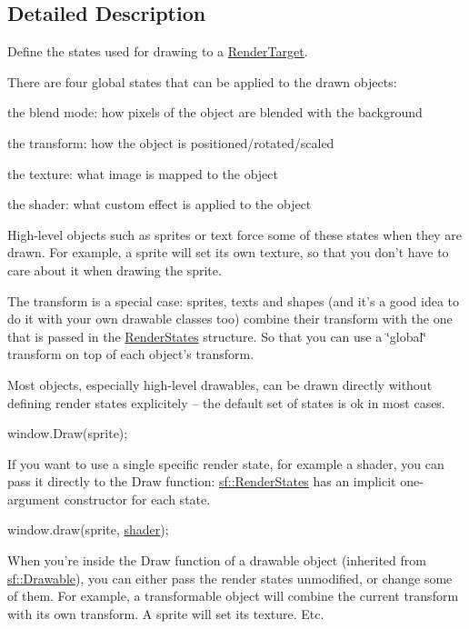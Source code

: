 \subsection{Detailed Description}
Define the states used for drawing to a \hyperlink{classsf_1_1_render_target}{Render\-Target}. 

There are four global states that can be applied to the drawn objects\-: \begin{DoxyItemize}
\item the blend mode\-: how pixels of the object are blended with the background \item the transform\-: how the object is positioned/rotated/scaled \item the texture\-: what image is mapped to the object \item the shader\-: what custom effect is applied to the object\end{DoxyItemize}
High-\/level objects such as sprites or text force some of these states when they are drawn. For example, a sprite will set its own texture, so that you don't have to care about it when drawing the sprite.

The transform is a special case\-: sprites, texts and shapes (and it's a good idea to do it with your own drawable classes too) combine their transform with the one that is passed in the \hyperlink{classsf_1_1_render_states}{Render\-States} structure. So that you can use a \char`\"{}global\char`\"{} transform on top of each object's transform.

Most objects, especially high-\/level drawables, can be drawn directly without defining render states explicitely -- the default set of states is ok in most cases. 
\begin{DoxyCode}
window.Draw(sprite);
\end{DoxyCode}


If you want to use a single specific render state, for example a shader, you can pass it directly to the Draw function\-: \hyperlink{classsf_1_1_render_states}{sf\-::\-Render\-States} has an implicit one-\/argument constructor for each state. 
\begin{DoxyCode}
window.draw(sprite, \hyperlink{gl3_8h_a57b2a96adb1d51204909a82d861e395e}{shader});
\end{DoxyCode}


When you're inside the Draw function of a drawable object (inherited from \hyperlink{classsf_1_1_drawable}{sf\-::\-Drawable}), you can either pass the render states unmodified, or change some of them. For example, a transformable object will combine the current transform with its own transform. A sprite will set its texture. Etc.

